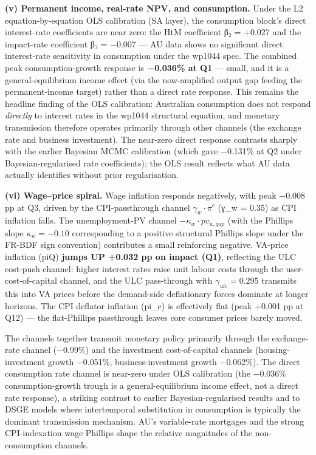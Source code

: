 \documentclass[
]{article}
\begin{document}
\textbf{(v) Permanent income, real-rate NPV, and consumption.} Under the
L2 equation-by-equation OLS calibration (SA layer), the consumption
block's direct interest-rate coefficients are near zero: the HtM
coefficient β₂ = +0.027 and the impact-rate coefficient β₃ = −0.007 ---
AU data shows no significant direct interest-rate sensitivity in
consumption under the wp1044 spec. The combined peak consumption-growth
response is \textbf{−0.036\% at Q1} --- small, and it is a
general-equilibrium income effect (via the now-amplified output gap
feeding the permanent-income target) rather than a direct rate response.
This remains the headline finding of the OLS calibration: Australian
consumption does not respond \emph{directly} to interest rates in the
wp1044 structural equation, and monetary transmission therefore operates
primarily through other channels (the exchange rate and business
investment). The near-zero direct response contrasts sharply with the
earlier Bayesian MCMC calibration (which gave −0.131\% at Q2 under
Bayesian-regularised rate coefficients); the OLS result reflects what AU
data actually identifies without prior regularisation.

\textbf{(vi) Wage--price spiral.} Wage inflation responds negatively,
with peak −0.008 pp at Q3, driven by the CPI-passthrough channel
\(\gamma_w \cdot \pi^c\) (γ\_w = 0.35) as CPI inflation falls. The
unemployment-PV channel \(-\kappa_w \cdot pv_{u,gap}\) (with the
Phillips slope \(\kappa_w = -0.10\) corresponding to a positive
structural Phillips slope under the FR-BDF sign convention) contributes
a small reinforcing negative. VA-price inflation (piQ) \textbf{jumps UP
+0.032 pp on impact (Q1)}, reflecting the ULC cost-push channel: higher
interest rates raise unit labour costs through the user-cost-of-capital
channel, and the ULC pass-through with \(\gamma_{ulc} = 0.295\)
transmits this into VA prices before the demand-side deflationary forces
dominate at longer horizons. The CPI deflator inflation (pi\_c) is
effectively flat (peak +0.001 pp at Q12) --- the flat-Phillips
passthrough leaves core consumer prices barely moved.

The channels together transmit monetary policy primarily through the
exchange-rate channel (−0.99\%) and the investment cost-of-capital
channels (housing-investment growth −0.051\%, business-investment growth
−0.062\%). The direct consumption rate channel is near-zero under OLS
calibration (the −0.036\% consumption-growth trough is a
general-equilibrium income effect, not a direct rate response), a
striking contrast to earlier Bayesian-regularised results and to DSGE
models where intertemporal substitution in consumption is typically the
dominant transmission mechanism. AU's variable-rate mortgages and the
strong CPI-indexation wage Phillips shape the relative magnitudes of the
non-consumption channels.
\end{document}
